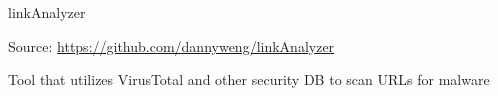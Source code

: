 
\begin{cventries}
  \cventry
    {} %
    {linkAnalyzer} %
    {} %
    {} %
    {
      \begin{cvitems} %
        \item {Source: \url{https://github.com/dannyweng/linkAnalyzer}}
		    \item {Tool that utilizes VirusTotal and other security DB to scan URLs for malware}
      \end{cvitems}
    }


\end{cventries}

